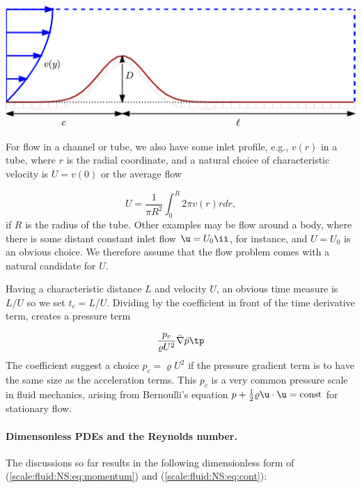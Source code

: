 \documentclass[graybox,envcountchap,sectrefs,final]{svmonodo}
\begin{document}
\vspace{3mm}




\vspace{3mm}





\centerline{\includegraphics[width=0.9\linewidth]{fig-scaling/flow_over_gaussian.pdf}}





\vspace{3mm}




\vspace{3mm}



For flow in a channel or tube, we also have some inlet profile, e.g.,
$v(r)$ in a tube, where $r$ is the radial coordinate, and a natural
choice of characteristic velocity is $U=v(0)$ or the average flow

\[ U = \frac{1}{\pi R^2}\int_0^R 2\pi v(r)rdr,\]
if $R$ is the radius of the tube. Other examples may be flow around
a body, where there is some distant constant inlet flow $\u = U_0\ii$,
for instance, and $U=U_0$ is an obvious choice. We therefore
assume that the flow problem comes with a natural candidate for $U$.

Having a characteristic distance $L$ and velocity $U$, an obvious
time measure is $L/U$ so we set $t_c=L/U$. Dividing by the
coefficient in front of the time derivative term, creates a pressure
term

\[ \frac{p_c}{\varrho U^2}\bar\nabla\bar p\tp\]
The coefficient suggest a choice $p_c=\varrho U^2$ if the pressure
gradient term is to have the same size as the acceleration terms.
This $p_c$ is a very common pressure scale in fluid mechanics,
arising from Bernoulli's equation $p + \frac{1}{2}\varrho \u\cdot\u =
\hbox{const}$ for stationary flow.


\paragraph{Dimensonless PDEs and the Reynolds number.}
The discussions so far results in the following dimensionless form of
(\ref{scale:fluid:NS:eq:momentum}) and (\ref{scale:fluid:NS:eq:cont}):
\end{document}
